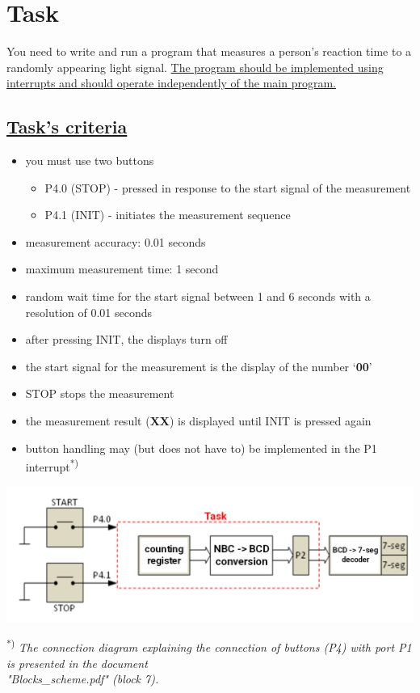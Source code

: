 \documentclass{article}
\begin{document}
\section*{Task}
You need to write and run a program that measures a person's reaction time to a randomly appearing light signal. \underline{The program should be implemented using interrupts and should operate independently of the main program.} \\

\subsection*{\underline{Task's criteria}}
\begin{itemize}
    \item you must use two buttons
    \begin{itemize}
        \item P4.0 (STOP) - pressed in response to the start signal of the measurement
        \item P4.1 (INIT) - initiates the measurement sequence
    \end{itemize}
    \item measurement accuracy: 0.01 seconds
    \item maximum measurement time: 1 second
    \item random wait time for the start signal between 1 and 6 seconds with a resolution of 0.01 seconds
    \item after pressing INIT, the displays turn off
    \item the start signal for the measurement is the display of the number \textquoteleft\textbf{00}\textquoteright
    \item STOP stops the measurement
    \item the measurement result (\textbf{XX}) is displayed until INIT is pressed again
    \item button handling may (but does not have to) be implemented in the P1 interrupt\textsuperscript{*)}
\end{itemize}

\noindent\includegraphics[width=\textwidth]{"img/TIMER_A_NBC2BCD_2.png"}
\vspace{5mm}

\textsuperscript{*)} \textit{The connection diagram explaining the connection of buttons (P4) with port P1 is presented in the document \\ "Blocks\_scheme.pdf" (block 7).}
\end{document}
